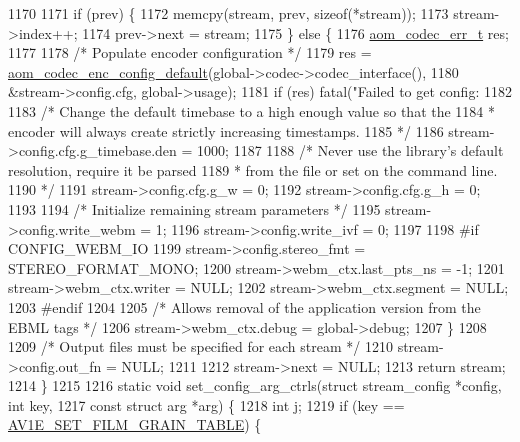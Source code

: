 \begin{DoxyCodeInclude}
{{{{{{{{{{{{{{{1170 
1171   \textcolor{keywordflow}{if} (prev) \{
1172     memcpy(stream, prev, \textcolor{keyword}{sizeof}(*stream));
1173     stream->index++;
1174     prev->next = stream;
1175   \} \textcolor{keywordflow}{else} \{
1176     \hyperlink{group__codec_gaaae61e0f8663e6137f1e228757248e7c}{aom\_codec\_err\_t} res;
1177 
1178     \textcolor{comment}{/* Populate encoder configuration */}
1179     res = \hyperlink{group__encoder_gabe456ab6f99bdebc47018779b75d2521}{aom\_codec\_enc\_config\_default}(global->codec->codec\_interface(),
1180                                        &stream->config.cfg, global->usage);
1181     \textcolor{keywordflow}{if} (res) fatal(\textcolor{stringliteral}{"Failed to get config: %
1182 
1183     \textcolor{comment}{/* Change the default timebase to a high enough value so that the}
1184 \textcolor{comment}{     * encoder will always create strictly increasing timestamps.}
1185 \textcolor{comment}{     */}
1186     stream->config.cfg.g\_timebase.den = 1000;
1187 
1188     \textcolor{comment}{/* Never use the library's default resolution, require it be parsed}
1189 \textcolor{comment}{     * from the file or set on the command line.}
1190 \textcolor{comment}{     */}
1191     stream->config.cfg.g\_w = 0;
1192     stream->config.cfg.g\_h = 0;
1193 
1194     \textcolor{comment}{/* Initialize remaining stream parameters */}
1195     stream->config.write\_webm = 1;
1196     stream->config.write\_ivf = 0;
1197 
1198 \textcolor{preprocessor}{#if CONFIG\_WEBM\_IO}
1199     stream->config.stereo\_fmt = STEREO\_FORMAT\_MONO;
1200     stream->webm\_ctx.last\_pts\_ns = -1;
1201     stream->webm\_ctx.writer = NULL;
1202     stream->webm\_ctx.segment = NULL;
1203 \textcolor{preprocessor}{#endif}
1204 
1205     \textcolor{comment}{/* Allows removal of the application version from the EBML tags */}
1206     stream->webm\_ctx.debug = global->debug;
1207   \}
1208 
1209   \textcolor{comment}{/* Output files must be specified for each stream */}
1210   stream->config.out\_fn = NULL;
1211 
1212   stream->next = NULL;
1213   \textcolor{keywordflow}{return} stream;
1214 \}
1215 
1216 \textcolor{keyword}{static} \textcolor{keywordtype}{void} set\_config\_arg\_ctrls(\textcolor{keyword}{struct} stream\_config *config, \textcolor{keywordtype}{int} key,
1217                                  \textcolor{keyword}{const} \textcolor{keyword}{struct} arg *arg) \{
1218   \textcolor{keywordtype}{int} j;
1219   \textcolor{keywordflow}{if} (key == \hyperlink{group__aom__encoder_ggae78dde67a6d78f332e9bdba0dde42db5ad5846c6f49d37e65a03c39e68d487097}{AV1E\_SET\_FILM\_GRAIN\_TABLE}) \{
}}}}}}}}}}}}}}}}
\end{DoxyCodeInclude}
